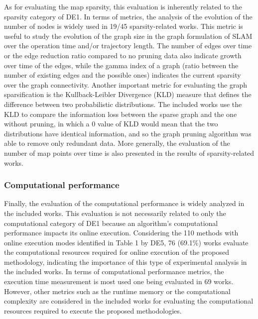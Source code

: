 As for evaluating the map sparsity, this evaluation is inherently related to the sparsity category of DE1.
In terms of metrics, the analysis of the evolution of the number of nodes is widely used in 19/45 sparsity-related works. This metric is useful to study the evolution of the graph size in the graph formulation of SLAM over the operation time and/or trajectory length.
The number of edges over time or the edge reduction ratio compared to no pruning data also indicate growth over time of the edges, while the gamma index of a graph (ratio between the number of existing edges and the possible ones) indicates the current sparsity over the graph connectivity.
Another important metric for evaluating the graph sparsification is the Kullback-Leibler Divergence (KLD) measure that defines the difference between two probabilistic distributions. The included works use the KLD to compare the information loss between the sparse graph and the one without pruning, in which a 0 value of KLD would mean that the two distributions have identical information, and so the graph pruning algorithm was able to remove only redundant data.
More generally, the evaluation of the number of map points over time is also presented in the results of sparsity-related works.



\subsubsection{Computational performance}

Finally, the evaluation of the computational performance is widely analyzed in the included works. This evaluation is not necessarily related to only the computational category of DE1 because an algorithm's computational performance impacts its online execution. Considering the 110 methods with online execution modes identified in Table 1 by DE5, 76 (69.1\%) works evaluate the computational resources required for online execution of the proposed methodology, indicating the importance of this type of experimental analysis in the included works. In terms of computational performance metrics, the execution time measurement is most used one being evaluated in 69 works. However, other metrics such as the runtime memory or the computational complexity are considered in the included works for evaluating the computational resources required to execute the proposed methodologies.




